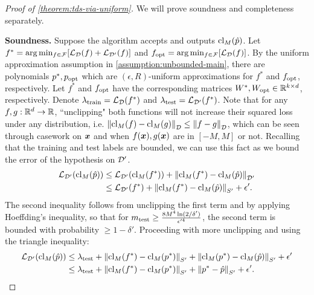 \documentclass[11pt]{article} %
\numberwithin{equation}{section}
\begin{document}
\begin{proof}[Proof of \cref{theorem:tds-via-uniform}]
    We will prove soundness and completeness separately.
    
    \textbf{Soundness.} Suppose the algorithm accepts and outputs $\mathrm{cl}_M(\hat p)$. Let $f^*= \arg \min_{f\in{\mathcal{F}}} [{\mathcal{L}}_{{\mathcal{D}}}(f)+ {\mathcal{L}}_{{\mathcal{D}}'}(f)]$ and $f_{\mathrm{opt}} = \arg \min_{f\in{\mathcal{F}}} [{\mathcal{L}}_{{\mathcal{D}}}(f)]$. By the uniform approximation assumption in \cref{assumption:unbounded-main}, there are polynomials $p^*, p_{\mathrm{opt}}$ which are $(\epsilon, R)$-uniform approximations for $f^*$ and $f_{\mathrm{opt}}$, respectively. Let $f^*$ and $f_{\mathrm{opt}}$ have the corresponding matrices $W^*, W_{\mathrm{opt}} \in \mathbb{R}^{k \times d}$, respectively. Denote $\lambda_{\mathrm{train}} = {\mathcal{L}}_{{\mathcal{D}}}(f^*)$ and $\lambda_{\mathrm{test}} = {\mathcal{L}}_{{\mathcal{D}}'}(f^*)$. Note that for any $f,g: \mathbb{R}^d \rightarrow \mathbb{R}$, ``unclipping" both functions will not increase their squared loss under any distribution, i.e. $\left\| \mathrm{cl}_M(f) - \mathrm{cl}_M(g) \right\|_{{\mathcal{D}}} \le \left\| f - g \right\|_{{\mathcal{D}}}$, which can be seen through casework on ${\bm{x}}$ and when $f({\bm{x}}), g({\bm{x}})$ are in $[-M, M]$ or not. 
    Recalling that the training and test labels are bounded, we can use this fact as we bound the error of the hypothesis on ${\mathcal{D}}'$.
    \begin{align*}
        {\mathcal{L}}_{{\mathcal{D}}'}(\mathrm{cl}_M(\hat p)) &\le {\mathcal{L}}_{{\mathcal{D}}'}(\mathrm{cl}_M(f^{*})) + \left\| \mathrm{cl}_M(f^{*}) - \mathrm{cl}_M(\hat p) \right\|_{{\mathcal{D}}'} \\
        &\le {\mathcal{L}}_{{\mathcal{D}}'}(f^*) + \left\| \mathrm{cl}_M(f^{*}) - \mathrm{cl}_M(\hat p) \right\|_{S'} + \epsilon'.
    \end{align*}
    The second inequality follows from unclipping the first term and by applying Hoeffding's inequality, so that for $m_{\mathrm{test}} \ge \frac{8M^4 \ln (2/\delta')}{\epsilon'^4}$, the second term is bounded with probability $\ge 1 - \delta'$. Proceeding with more unclipping and using the triangle inequality:
    \begin{align}
        {\mathcal{L}}_{{\mathcal{D}}'}(\mathrm{cl}_M(\hat p)) &\le \lambda_{\mathrm{test}} + \left\| \mathrm{cl}_M(f^{*}) - \mathrm{cl}_M(p^{*}) \right\|_{S'} + \left\| \mathrm{cl}_M(p^{*}) - \mathrm{cl}_M(\hat p) \right\|_{S'} + \epsilon' \notag \\
        &\le \lambda_{\mathrm{test}} + \left\| \mathrm{cl}_M(f^{*}) - \mathrm{cl}_M(p^{*}) \right\|_{S'} + \left\| p^{*} - \hat{p} \right\|_{S'} + \epsilon'. \label{eqn: phM_loss}
    \end{align}


\end{proof}
\end{document}
